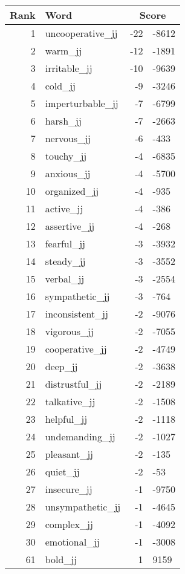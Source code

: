 \begin{longtable}[!htbp]{| rlr@{.}l |}
    \hline
    \textbf{Rank} & \textbf{Word} & \multicolumn{2}{c|}{\textbf{Score}} \\
    \hline
    \endhead
    1 & uncooperative\_jj & -22 & -8612 \\
    2 & warm\_jj & -12 & -1891 \\
    3 & irritable\_jj & -10 & -9639 \\
    4 & cold\_jj & -9 & -3246 \\
    5 & imperturbable\_jj & -7 & -6799 \\
    6 & harsh\_jj & -7 & -2663 \\
    7 & nervous\_jj & -6 & -433 \\
    8 & touchy\_jj & -4 & -6835 \\
    9 & anxious\_jj & -4 & -5700 \\
    10 & organized\_jj & -4 & -935 \\
    11 & active\_jj & -4 & -386 \\
    12 & assertive\_jj & -4 & -268 \\
    13 & fearful\_jj & -3 & -3932 \\
    14 & steady\_jj & -3 & -3552 \\
    15 & verbal\_jj & -3 & -2554 \\
    16 & sympathetic\_jj & -3 & -764 \\
    17 & inconsistent\_jj & -2 & -9076 \\
    18 & vigorous\_jj & -2 & -7055 \\
    19 & cooperative\_jj & -2 & -4749 \\
    20 & deep\_jj & -2 & -3638 \\
    21 & distrustful\_jj & -2 & -2189 \\
    22 & talkative\_jj & -2 & -1508 \\
    23 & helpful\_jj & -2 & -1118 \\
    24 & undemanding\_jj & -2 & -1027 \\
    25 & pleasant\_jj & -2 & -135 \\
    26 & quiet\_jj & -2 & -53 \\
    27 & insecure\_jj & -1 & -9750 \\
    28 & unsympathetic\_jj & -1 & -4645 \\
    29 & complex\_jj & -1 & -4092 \\
    30 & emotional\_jj & -1 & -3008 \\
    61 & bold\_jj & 1 & 9159 \\

\end{longtable}
